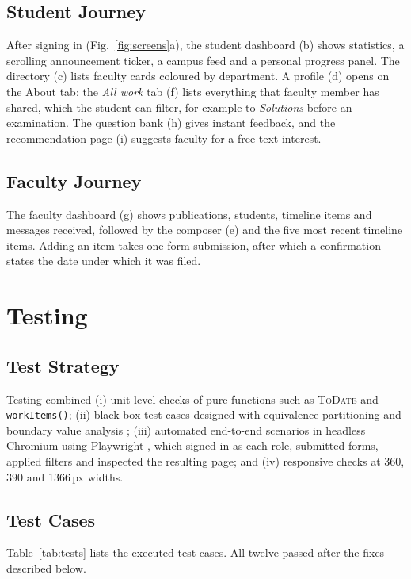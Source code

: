 \documentclass[conference]{IEEEtran}
\begin{document}
\subsection{Student Journey}
After signing in (Fig.~\ref{fig:screens}a), the student dashboard (b) shows statistics, a scrolling announcement ticker, a campus feed and a personal progress panel. The directory (c) lists faculty cards coloured by department. A profile (d) opens on the About tab; the \emph{All work} tab (f) lists everything that faculty member has shared, which the student can filter, for example to \emph{Solutions} before an examination. The question bank (h) gives instant feedback, and the recommendation page (i) suggests faculty for a free-text interest.

\subsection{Faculty Journey}
The faculty dashboard (g) shows publications, students, timeline items and messages received, followed by the composer (e) and the five most recent timeline items. Adding an item takes one form submission, after which a confirmation states the date under which it was filed.

\section{Testing}

\subsection{Test Strategy}
Testing combined (i) unit-level checks of pure functions such as \textsc{ToDate} and \texttt{workItems()}; (ii) black-box test cases designed with equivalence partitioning and boundary value analysis \cite{pressman}; (iii) automated end-to-end scenarios in headless Chromium using Playwright \cite{playwright}, which signed in as each role, submitted forms, applied filters and inspected the resulting page; and (iv) responsive checks at 360, 390 and 1366\,px widths.

\subsection{Test Cases}
Table~\ref{tab:tests} lists the executed test cases. All twelve passed after the fixes described below.
\end{document}
